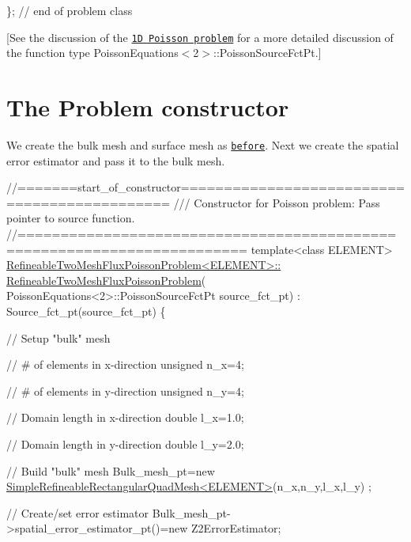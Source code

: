 \begin{DoxyCodeInclude}
\}; \textcolor{comment}{// end of problem class}

\end{DoxyCodeInclude}


\mbox{[}See the discussion of the \href{../../one_d_poisson/html/index.html}{\tt 1D Poisson problem} for a more detailed discussion of the function type Poisson\+Equations$<$2$>$\+::\+Poisson\+Source\+Fct\+Pt.\mbox{]}



 

\hypertarget{index_constructor}{}\section{The Problem constructor}\label{index_constructor}
We create the bulk mesh and surface mesh as \href{../../two_d_poisson_flux_bc2/html/index.html#constructor}{\tt before}. Next we create the spatial error estimator and pass it to the bulk mesh.


\begin{DoxyCodeInclude}
\textcolor{comment}{//=======start\_of\_constructor=============================================}
\textcolor{comment}{/// Constructor for Poisson problem: Pass pointer to source function.}
\textcolor{comment}{}\textcolor{comment}{//========================================================================}
\textcolor{keyword}{template}<\textcolor{keyword}{class} ELEMENT>
\hyperlink{classRefineableTwoMeshFluxPoissonProblem_a6568980564c4e39544b1c2bcb71cf3b6}{RefineableTwoMeshFluxPoissonProblem<ELEMENT>::}
\hyperlink{classRefineableTwoMeshFluxPoissonProblem_a6568980564c4e39544b1c2bcb71cf3b6}{RefineableTwoMeshFluxPoissonProblem}(
      PoissonEquations<2>::PoissonSourceFctPt source\_fct\_pt)
 :  Source\_fct\_pt(source\_fct\_pt)
\{ 

 \textcolor{comment}{// Setup "bulk" mesh}

 \textcolor{comment}{// # of elements in x-direction}
 \textcolor{keywordtype}{unsigned} n\_x=4;

 \textcolor{comment}{// # of elements in y-direction}
 \textcolor{keywordtype}{unsigned} n\_y=4;

 \textcolor{comment}{// Domain length in x-direction}
 \textcolor{keywordtype}{double} l\_x=1.0;

 \textcolor{comment}{// Domain length in y-direction}
 \textcolor{keywordtype}{double} l\_y=2.0;

 \textcolor{comment}{// Build "bulk" mesh}
 Bulk\_mesh\_pt=\textcolor{keyword}{new} 
  \hyperlink{classSimpleRefineableRectangularQuadMesh}{SimpleRefineableRectangularQuadMesh<ELEMENT>}(n\_x,n\_y,l\_x,l\_y)
      ;

 \textcolor{comment}{// Create/set error estimator}
 Bulk\_mesh\_pt->spatial\_error\_estimator\_pt()=\textcolor{keyword}{new} Z2ErrorEstimator;

\end{DoxyCodeInclude}



